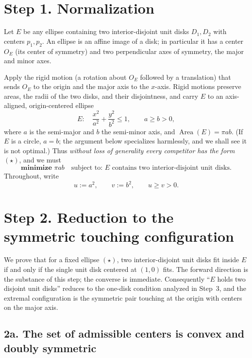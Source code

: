 \documentclass[11pt]{article}
\DeclareMathOperator{\Area}{Area}
\begin{document}
\section*{Step 1. Normalization}

Let $E$ be any ellipse containing two interior-disjoint unit disks $D_1,D_2$ with centers
$p_1,p_2$. An ellipse is an affine image of a disk; in particular it has a center $O_E$
(its center of symmetry) and two perpendicular axes of symmetry, the major and minor axes.

Apply the rigid motion (a rotation about $O_E$ followed by a translation) that sends $O_E$
to the origin and the major axis to the $x$-axis. Rigid motions preserve areas, the radii
of the two disks, and their disjointness, and carry $E$ to an axis-aligned, origin-centered
ellipse
\begin{equation}
E:\quad \frac{x^2}{a^2}+\frac{y^2}{b^2}\le 1,\qquad a\ge b>0, \tag{$\star$}
\end{equation}
where $a$ is the semi-major and $b$ the semi-minor axis, and $\Area(E)=\pi ab$. (If $E$ is a
circle, $a=b$; the argument below specializes harmlessly, and we shall see it is not
optimal.) Thus \emph{without loss of generality every competitor has the form $(\star)$},
and we must
\[
\textbf{minimize } \pi ab \quad\text{subject to: $E$ contains two interior-disjoint unit disks.}
\]
Throughout, write
\[
u:=a^2,\qquad v:=b^2,\qquad u\ge v>0 .
\]

\section*{Step 2. Reduction to the symmetric touching configuration}

We prove that for a fixed ellipse $(\star)$, two interior-disjoint unit disks fit inside $E$ if and
only if the single unit disk centered at $(1,0)$ fits. The forward direction is the substance of this
step; the converse is immediate. Consequently ``$E$ holds two disjoint unit disks'' reduces to the
one-disk condition analyzed in Step~3, and the extremal configuration is the symmetric pair touching
at the origin with centers on the major axis.

\subsection*{2a. The set of admissible centers is convex and doubly symmetric}
\end{document}
